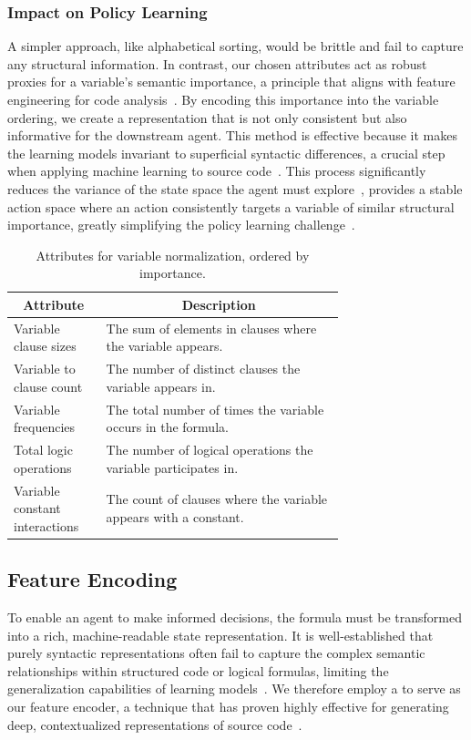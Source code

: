 \subsubsection{Impact on Policy Learning}
A simpler approach, like alphabetical sorting, would be brittle and fail to capture any structural information. In contrast, our chosen attributes act as robust proxies for a variable's semantic importance, a principle that aligns with feature engineering for code analysis~\cite{henkel2023neural}. By encoding this importance into the variable ordering, we create a representation that is not only consistent but also informative for the downstream agent. This method is effective because it makes the learning models invariant to superficial syntactic differences, a crucial step when applying machine learning to source code~\cite{alon2019code2vec}. This process significantly reduces the variance of the state space the \RL{} agent must explore~\cite{bengio2009learning}, provides a stable action space where an action consistently targets a variable of similar structural importance, greatly simplifying the policy learning challenge~\cite{laskin2021urlb}.
\begin{table}[!t]
    \centering
    \caption{Attributes for variable normalization, ordered by importance.}
    \label{tab:normalization-attributes}
    \begin{tabular}{@{} l p{0.72\linewidth} @{} }
    \toprule
        \multicolumn{1}{c}{\textbf{Attribute}} & \multicolumn{1}{c}{\textbf{Description}} \\ \midrule
        Variable clause sizes   & The sum of elements in clauses where the variable appears. \\ 
        Variable to clause count & The number of distinct clauses the variable appears in. \\ 
        Variable frequencies & The total number of times the variable occurs in the formula. \\ 
        Total logic operations & The number of logical operations the variable participates in. \\ 
        Variable constant interactions & The count of clauses where the variable appears with a constant. \\ \bottomrule
    \end{tabular}
\end{table}
\subsection{Feature Encoding}
\label{sec:feature-encoding}
To enable an \RL{} agent to make informed decisions, the \SMT{} formula must be transformed into a rich, machine-readable state representation. It is well-established that purely syntactic representations often fail to capture the complex semantic relationships within structured code or logical formulas, limiting the generalization capabilities of learning models~\cite{alon2019code2vec}. We therefore employ a \PLM{} to serve as our feature encoder, a technique that has proven highly effective for generating deep, contextualized representations of source code~\cite{feng2020codebert}.

